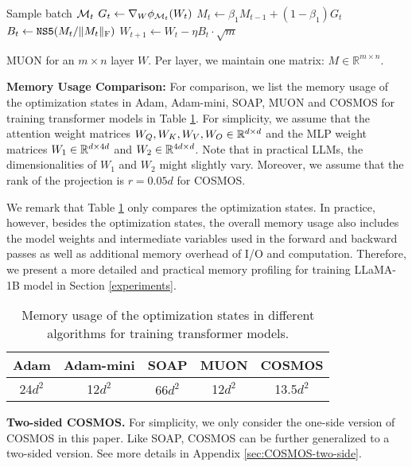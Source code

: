 \begin{algorithm}[htb!]
	\begin{algorithmic}[1]
		\STATE Sample batch $\mathcal{M}_t$
		\STATE $G_t \gets \nabla_W \phi_{\mathcal{M}_t}(W_t)$
        \STATE $M_t \gets \beta_1M_{t-1}+(1-\beta_1)G_t$
        \STATE $B_t \gets \texttt{NS5}(M_t/\|M_t\|_{\rm F})$
        \STATE $\displaystyle W_{t+1} \gets W_{t} -\eta B_t\cdot \sqrt{m}$
        \ENDFOR
	\end{algorithmic}
	\caption{MUON for an $m \times n$ layer $W$. Per layer, we maintain one matrix: $M \in \mathbb{R}^{m \times n}$.}
	\label{alg:MUON}
\end{algorithm}

\vskip2pt
\noindent \textbf{Memory Usage Comparison:} For comparison, we list the memory usage of the optimization states in Adam, Adam-mini, SOAP, MUON and COSMOS for training transformer models in Table \ref{tab:pred-memory}. For simplicity, we assume that the attention weight matrices $W_Q,W_K,W_V,W_O\in \mathbb{R}^{d\times d}$ and the MLP weight matrices $W_1\in \mathbb{R}^{d\times 4d}$ and $W_2\in \mathbb{R}^{4d\times d}$. Note that in practical LLMs, the dimensionalities of $W_1$ and $W_2$ might slightly vary. Moreover, we assume that the rank of the projection is $r=0.05d$ for COSMOS.

We remark that Table \ref{tab:pred-memory} only compares the optimization states. In practice, however, besides the optimization states, the overall memory usage also includes the model weights and intermediate variables used in the forward and backward passes as well as additional memory overhead of I/O and computation. Therefore, we present a more detailed and practical memory profiling for training LLaMA-1B model in Section \ref{experiments}.

\begin{table}[htb!]
    \caption{Memory usage of the optimization states in different algorithms for training transformer models.}
    \label{tab:pred-memory}
    \centering
    \begin{tabular}{ccccc}
    \toprule
    Adam &Adam-mini &SOAP &MUON &COSMOS\\
    \hline
    24$d^2$& 12$d^2$ &$66d^2$ &12$d^2$ &13.5$d^2$\\
    \bottomrule
    \end{tabular}
\end{table}

\vskip2pt
\noindent\textbf{Two-sided COSMOS.} For simplicity, we only consider the one-side version of COSMOS in this paper. Like SOAP, COSMOS can be further generalized to a two-sided version. See more details in Appendix \ref{sec:COSMOS-two-side}.